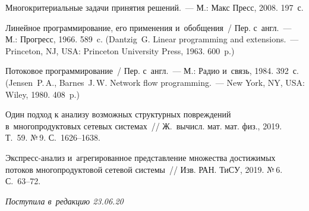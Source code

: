 \begin{multicols}{2}
{\small\frenchspacing
 {%
 \begin{thebibliography}{9}
    
Многокритериальные задачи принятия решений.~--- М.: Макс Пресс, 2008. 197~с.



  Линейное программирование, 
его применения и~обобщения~/ Пер. с~англ.~--- М.: Прогресс, 1966. 589~c. 
(Dantzig~G.  Linear programming and extensions.~--- 
Princeton, NJ, USA: Princeton University Press, 1963. 600~p.)


  
Потоковое программирование~/ Пер. с~англ.~--- М.: Радио и~связь, 1984. 392~с. 
(Jensen~P.\,A., Barnes~J.\,W. Network flow programming.~--- 
New York, NY, USA: Wiley, 1980. 408~p.)


  
Один подход к анализу возможных  структурных  повреждений  в~многопродуктовых  
сетевых системах~// Ж.~вычисл. мат. мат. физ., 2019. Т.~59.  №\,9. С.~1626--1638.

  
Экс\-пресс-ана\-лиз и~агрегированное представление множества достижимых 
потоков многопродуктовой сетевой системы~// Изв. РАН. ТиСУ, 2019. №\,6. 
С.~63--72.
\end{thebibliography}

 }
 }

\end{multicols}

\vspace*{-6pt}

\hfill{\small\textit{Поступила в~редакцию 23.06.20}}

\vspace*{8pt}


\newpage

\vspace*{-28pt}





\def\tit{APPROXIMATION OF~THE~MULTIUSER NETWORK FEASIBLE FLOWS SET}

